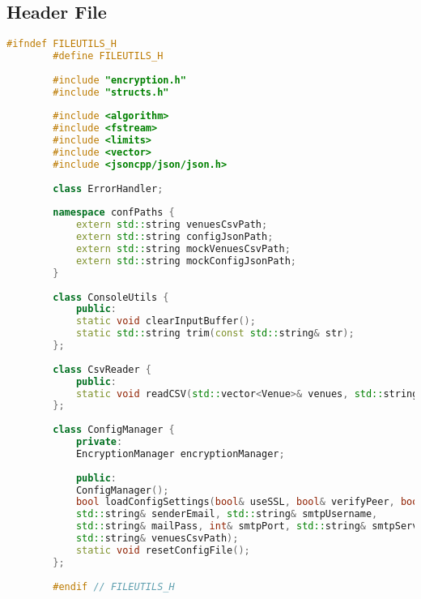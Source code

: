 \documentclass{article}
\begin{document}
	\subsection*{Header File}
	\begin{mdframed}[backgroundcolor=background, hidealllines=false, innerleftmargin=15pt, innerrightmargin=5pt, innertopmargin=0pt, innerbottommargin=-5pt, linecolor=accent]
	\begin{lstlisting}[language=C++]
		#ifndef FILEUTILS_H
		#define FILEUTILS_H
		
		#include "encryption.h"
		#include "structs.h"
		
		#include <algorithm>
		#include <fstream> 
		#include <limits>
		#include <vector>
		#include <jsoncpp/json/json.h>
		
		class ErrorHandler;
		
		namespace confPaths {
			extern std::string venuesCsvPath;
			extern std::string configJsonPath;
			extern std::string mockVenuesCsvPath;
			extern std::string mockConfigJsonPath;
		}
		
		class ConsoleUtils {
			public:
			static void clearInputBuffer();
			static std::string trim(const std::string& str);
		};
		
		class CsvReader {
			public:
			static void readCSV(std::vector<Venue>& venues, std::string& venuesCsvPath);
		};
		
		class ConfigManager {
			private:
			EncryptionManager encryptionManager;
			
			public:
			ConfigManager();
			bool loadConfigSettings(bool& useSSL, bool& verifyPeer, bool& verifyHost, bool& verbose, 
			std::string& senderEmail, std::string& smtpUsername, 
			std::string& mailPass, int& smtpPort, std::string& smtpServer, 
			std::string& venuesCsvPath);
			static void resetConfigFile();
		};
		
		#endif // FILEUTILS_H
	\end{lstlisting}
\end{mdframed}
\end{document}
